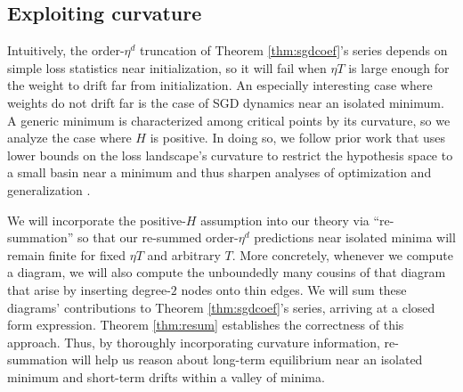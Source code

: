 \documentclass{article}
\theoremstyle{plain}
\theoremstyle{definition}
\begin{document}
    \subsection{Exploiting curvature} \label{subsect:effective}
        Intuitively, the order-$\eta^d$ truncation of Theorem
        \ref{thm:sgdcoef}'s series depends on simple loss statistics near
        initialization, so it will fail when $\eta T$ is large enough for the
        weight to drift far from initialization.  An especially interesting
        case where weights do not drift far is the case of SGD dynamics near an
        isolated minimum.  A generic minimum is characterized among critical
        points by its curvature, so we analyze the case where $H$ is positive.
        In doing so, we follow prior work that uses lower bounds on the loss
        landscape's curvature to restrict the hypothesis space to a small basin
        near a minimum and thus sharpen analyses of optimization and
        generalization \cite{ba05}.

        We will incorporate the positive-$H$ assumption into our theory via
        ``re-summation'' so that our re-summed order-$\eta^d$ predictions near
        isolated minima will remain finite for fixed $\eta T$ and arbitrary
        $T$.  More concretely, whenever we compute a diagram, we will also
        compute the unboundedly many cousins of that diagram that arise by
        inserting degree-$2$ nodes onto thin edges.  We will sum these
        diagrams' contributions to Theorem \ref{thm:sgdcoef}'s series, arriving
        at a closed form expression.  Theorem \ref{thm:resum} establishes the
        correctness of this approach.  Thus, by thoroughly incorporating
        curvature information, re-summation will help us reason about long-term
        equilibrium near an isolated minimum and short-term drifts within a
        valley of minima.
\end{document}
